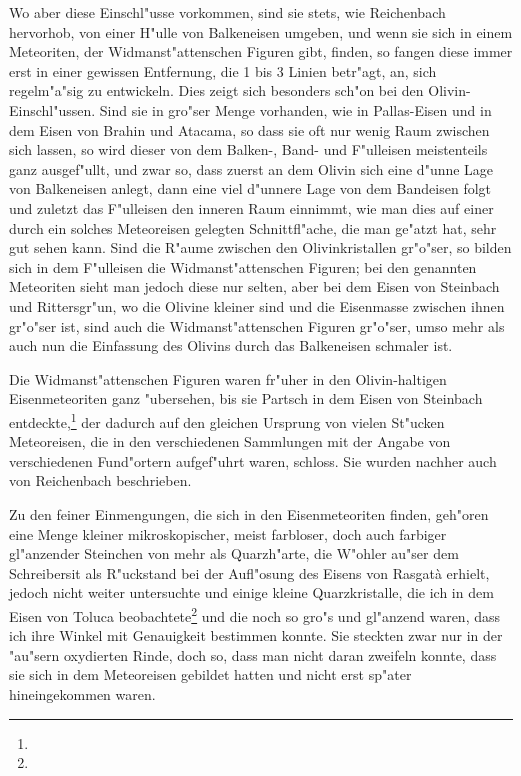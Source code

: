 \documentclass[a4paper, 11pt, oneside]{article}
\begin{document}
Wo aber diese Einschl"usse vorkommen, sind sie stets, wie Reichenbach hervorhob, von einer H"ulle von Balkeneisen umgeben, und wenn sie sich in einem Meteoriten, der Widmanst"attenschen Figuren gibt, finden, so fangen diese immer erst in einer gewissen Entfernung, die 1 bis 3 Linien betr"agt, an, sich regelm"a"sig zu entwickeln. Dies zeigt sich besonders sch"on bei den Olivin-Einschl"ussen. Sind sie in gro"ser Menge vorhanden, wie in Pallas-Eisen und in dem Eisen von Brahin und Atacama, so dass sie oft nur wenig Raum zwischen sich lassen, so wird dieser von dem Balken-, Band- und F"ulleisen meistenteils ganz ausgef"ullt, und zwar so, dass zuerst an dem Olivin sich eine d"unne Lage von Balkeneisen anlegt, dann eine viel d"unnere Lage von dem Bandeisen folgt und zuletzt das F"ulleisen den inneren Raum einnimmt, wie man dies auf einer durch ein solches Meteoreisen gelegten Schnittfl"ache, die man ge"atzt hat, sehr gut sehen kann. Sind die R"aume zwischen den Olivinkristallen gr"o"ser, so bilden sich in dem F"ulleisen die Widmanst"attenschen Figuren; bei den genannten Meteoriten sieht man jedoch diese nur selten, aber bei dem Eisen von Steinbach und Rittersgr"un, wo die Olivine kleiner sind und die Eisenmasse zwischen ihnen gr"o"ser ist, sind auch die Widmanst"attenschen Figuren gr"o"ser, umso mehr als auch nun die Einfassung des Olivins durch das Balkeneisen schmaler ist.

Die Widmanst"attenschen Figuren waren fr"uher in den Olivin-haltigen Eisenmeteoriten ganz "ubersehen, bis sie Partsch in dem Eisen von Steinbach entdeckte,\footnote{} der dadurch auf den gleichen Ursprung von vielen St"ucken Meteoreisen, die in den verschiedenen Sammlungen mit der Angabe von verschiedenen Fund"ortern aufgef"uhrt waren, schloss. Sie wurden nachher auch von Reichenbach beschrieben.

Zu den feiner Einmengungen, die sich in den Eisenmeteoriten finden, geh"oren eine Menge kleiner mikroskopischer, meist farbloser, doch auch farbiger gl"anzender Steinchen von mehr als Quarzh"arte, die W"ohler au"ser dem Schreibersit als R"uckstand bei der Aufl"osung des Eisens von Rasgatà erhielt, jedoch nicht weiter untersuchte und einige kleine Quarzkristalle, die ich in dem Eisen von Toluca beobachtete\footnote{} und die noch so gro"s und gl"anzend waren, dass ich ihre Winkel mit Genauigkeit bestimmen konnte. Sie steckten zwar nur in der "au"sern oxydierten Rinde, doch so, dass man nicht daran zweifeln konnte, dass sie sich in dem Meteoreisen gebildet hatten und nicht erst sp"ater hineingekommen waren.
\end{document}
